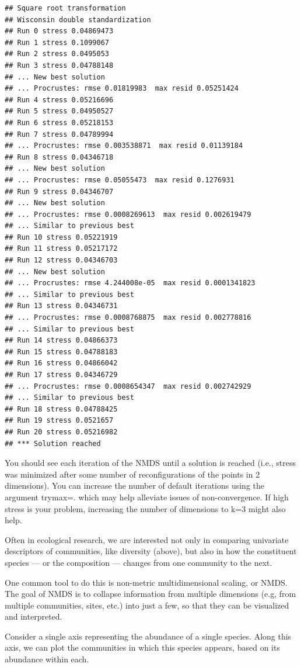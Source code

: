 \documentclass[
]{book}
\begin{document}
\begin{verbatim}
## Square root transformation
## Wisconsin double standardization
## Run 0 stress 0.04869473 
## Run 1 stress 0.1099067 
## Run 2 stress 0.0495053 
## Run 3 stress 0.04788148 
## ... New best solution
## ... Procrustes: rmse 0.01819983  max resid 0.05251424 
## Run 4 stress 0.05216696 
## Run 5 stress 0.04950527 
## Run 6 stress 0.05218153 
## Run 7 stress 0.04789994 
## ... Procrustes: rmse 0.003538871  max resid 0.01139184 
## Run 8 stress 0.04346718 
## ... New best solution
## ... Procrustes: rmse 0.05055473  max resid 0.1276931 
## Run 9 stress 0.04346707 
## ... New best solution
## ... Procrustes: rmse 0.0008269613  max resid 0.002619479 
## ... Similar to previous best
## Run 10 stress 0.05221919 
## Run 11 stress 0.05217172 
## Run 12 stress 0.04346703 
## ... New best solution
## ... Procrustes: rmse 4.244008e-05  max resid 0.0001341823 
## ... Similar to previous best
## Run 13 stress 0.04346731 
## ... Procrustes: rmse 0.0008768875  max resid 0.002778816 
## ... Similar to previous best
## Run 14 stress 0.04866373 
## Run 15 stress 0.04788183 
## Run 16 stress 0.04866042 
## Run 17 stress 0.04346729 
## ... Procrustes: rmse 0.0008654347  max resid 0.002742929 
## ... Similar to previous best
## Run 18 stress 0.04788425 
## Run 19 stress 0.0521657 
## Run 20 stress 0.05216982 
## *** Solution reached
\end{verbatim}

You should see each iteration of the NMDS until a solution is reached (i.e., stress was minimized after some number of reconfigurations of the points in 2 dimensions). You can increase the number of default iterations using the argument trymax=. which may help alleviate issues of non-convergence. If high stress is your problem, increasing the number of dimensions to k=3 might also help.

Often in ecological research, we are interested not only in comparing univariate descriptors of communities, like diversity (above), but also in how the constituent species --- or the composition --- changes from one community to the next.

One common tool to do this is non-metric multidimensional scaling, or NMDS. The goal of NMDS is to collapse information from multiple dimensions (e.g, from multiple communities, sites, etc.) into just a few, so that they can be visualized and interpreted.

Consider a single axis representing the abundance of a single species. Along this axis, we can plot the communities in which this species appears, based on its abundance within each.
\end{document}
